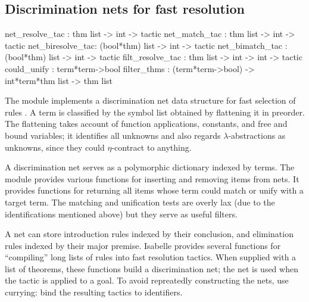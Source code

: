 \subsection{Discrimination nets for fast resolution}
\begin{ttbox} 
net_resolve_tac  : thm list -> int -> tactic
net_match_tac    : thm list -> int -> tactic
net_biresolve_tac: (bool*thm) list -> int -> tactic
net_bimatch_tac  : (bool*thm) list -> int -> tactic
filt_resolve_tac : thm list -> int -> int -> tactic
could_unify      : term*term->bool
filter_thms      : (term*term->bool) -> int*term*thm list -> thm list
\end{ttbox}
The module  implements a discrimination net data structure for
fast selection of rules \cite[Chapter 14]{charniak80}.  A term is
classified by the symbol list obtained by flattening it in preorder.
The flattening takes account of function applications, constants, and free
and bound variables; it identifies all unknowns and also regards
$\lambda$-abstractions as unknowns, since they could $\eta$-contract to
anything.  

A discrimination net serves as a polymorphic dictionary indexed by terms.
The module provides various functions for inserting and removing items from
nets.  It provides functions for returning all items whose term could match
or unify with a target term.  The matching and unification tests are
overly lax (due to the identifications mentioned above) but they serve as
useful filters.

A net can store introduction rules indexed by their conclusion, and
elimination rules indexed by their major premise.  Isabelle provides
several functions for ``compiling'' long lists of rules into fast
resolution tactics.  When supplied with a list of theorems, these functions
build a discrimination net; the net is used when the tactic is applied to a
goal.  To avoid repreatedly constructing the nets, use currying: bind the
resulting tactics to \ML{} identifiers.

